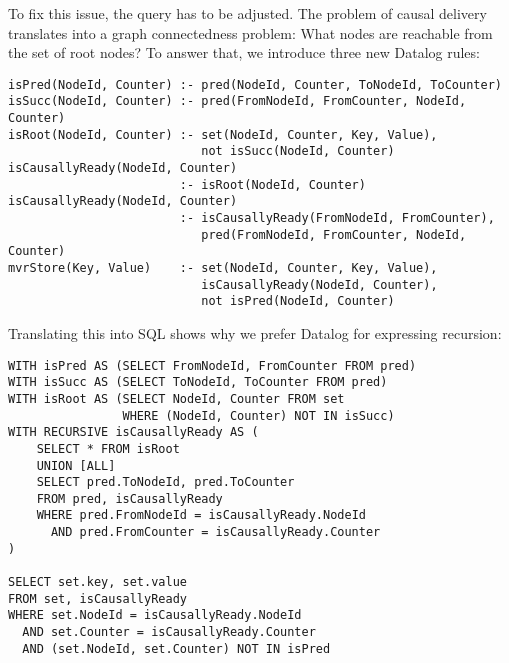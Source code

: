 \documentclass{article}
\begin{document}
To fix this issue, the query has to be adjusted.
The problem of causal delivery translates into a graph connectedness
problem: What nodes are reachable from the set of root nodes?
To answer that, we introduce three new Datalog rules:

\begin{small}
	\begin{verbatim}
isPred(NodeId, Counter) :- pred(NodeId, Counter, ToNodeId, ToCounter)
isSucc(NodeId, Counter) :- pred(FromNodeId, FromCounter, NodeId, Counter)
isRoot(NodeId, Counter) :- set(NodeId, Counter, Key, Value),
                           not isSucc(NodeId, Counter)
isCausallyReady(NodeId, Counter)
                        :- isRoot(NodeId, Counter)
isCausallyReady(NodeId, Counter)
                        :- isCausallyReady(FromNodeId, FromCounter),
                           pred(FromNodeId, FromCounter, NodeId, Counter)
mvrStore(Key, Value)    :- set(NodeId, Counter, Key, Value),
                           isCausallyReady(NodeId, Counter),
                           not isPred(NodeId, Counter)
\end{verbatim}
\end{small}

Translating this into SQL shows why we prefer Datalog for expressing recursion:

\begin{small}
	\begin{verbatim}
WITH isPred AS (SELECT FromNodeId, FromCounter FROM pred)
WITH isSucc AS (SELECT ToNodeId, ToCounter FROM pred)
WITH isRoot AS (SELECT NodeId, Counter FROM set
                WHERE (NodeId, Counter) NOT IN isSucc)
WITH RECURSIVE isCausallyReady AS (
    SELECT * FROM isRoot
    UNION [ALL]
    SELECT pred.ToNodeId, pred.ToCounter
    FROM pred, isCausallyReady
    WHERE pred.FromNodeId = isCausallyReady.NodeId
      AND pred.FromCounter = isCausallyReady.Counter
)

SELECT set.key, set.value
FROM set, isCausallyReady
WHERE set.NodeId = isCausallyReady.NodeId
  AND set.Counter = isCausallyReady.Counter
  AND (set.NodeId, set.Counter) NOT IN isPred
\end{verbatim}
\end{small}
\end{document}
